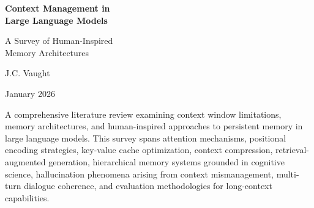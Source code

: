 \documentclass[11pt,letterpaper]{article}
\begin{document}
\begin{titlepage}
\centering
\vspace*{2cm}
{\Huge\bfseries\color{garnet} Context Management in\\Large Language Models\par}
\vspace{0.75cm}
{\LARGE\color{congaree} A Survey of Human-Inspired\\Memory Architectures\par}
\vspace{2cm}
{\Large J.C. Vaught\par}
\vspace{0.5cm}
{\large January 2026\par}
\vspace{3cm}
{\large\color{black70}
A comprehensive literature review examining context window limitations, memory architectures, and human-inspired approaches to persistent memory in large language models. This survey spans attention mechanisms, positional encoding strategies, key-value cache optimization, context compression, retrieval-augmented generation, hierarchical memory systems grounded in cognitive science, hallucination phenomena arising from context mismanagement, multi-turn dialogue coherence, and evaluation methodologies for long-context capabilities.\par}
\end{titlepage}
\end{document}
